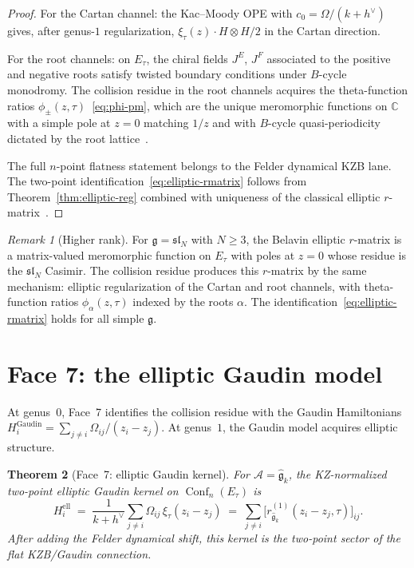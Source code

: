 \documentclass[11pt]{article}
\theoremstyle{plain}
\newtheorem{theorem}{Theorem}[section]
\theoremstyle{definition}
\theoremstyle{remark}
\newtheorem{remark}[theorem]{Remark}
\newcommand{\fg}{\mathfrak{g}}
\newcommand{\fsl}{\mathfrak{sl}}
\newcommand{\cA}{\mathcal{A}}
\DeclareMathOperator{\Conf}{Conf}
\numberwithin{equation}{section}
\begin{document}
\begin{proof}
For the Cartan channel: the Kac--Moody OPE with
$c_0 = \Omega/(k+h^\vee)$ gives, after genus-$1$ regularization,
$\xi_\tau(z)\cdot H \otimes H/2$ in the Cartan direction.

For the root channels: on $E_\tau$, the chiral fields $J^E$, $J^F$
associated to the positive and negative roots satisfy twisted boundary
conditions under $B$-cycle monodromy. The collision residue in the
root channels acquires the theta-function ratios
$\phi_\pm(z,\tau)$~\eqref{eq:phi-pm}, which are the unique
meromorphic functions on $\mathbb{C}$ with a simple pole at $z = 0$
matching $1/z$ and with $B$-cycle quasi-periodicity dictated by the
root lattice~\cite{Belavin81}.

The full \(n\)-point flatness statement belongs to the Felder dynamical
KZB lane. The two-point identification~\eqref{eq:elliptic-rmatrix}
follows from
Theorem~\ref{thm:elliptic-reg} combined with uniqueness of the
classical elliptic $r$-matrix~\cite{BelavinDrinfeld82}.
\end{proof}

\begin{remark}[Higher rank]\label{rem:higher-rank}
For $\fg = \fsl_N$ with $N \geq 3$, the Belavin elliptic $r$-matrix
is a matrix-valued meromorphic function on $E_\tau$ with poles at
$z = 0$ whose residue is the $\fsl_N$ Casimir. The collision residue
produces this $r$-matrix by the same mechanism: elliptic
regularization of the Cartan and root channels, with theta-function
ratios $\phi_\alpha(z,\tau)$ indexed by the roots $\alpha$. The
identification~\eqref{eq:elliptic-rmatrix} holds for all simple $\fg$.
\end{remark}



\section{Face 7: the elliptic Gaudin model}\label{sec:gaudin}

At genus~$0$, Face~7 identifies the collision residue with the Gaudin
Hamiltonians
$H_i^{\mathrm{Gaudin}} = \sum_{j \neq i}\Omega_{ij}/(z_i - z_j)$.
At genus~$1$, the Gaudin model acquires elliptic structure.

\begin{theorem}[Face~7: elliptic Gaudin kernel]\label{thm:gaudin}
For $\cA = \widehat{\fg}_k$, the KZ-normalized two-point elliptic
Gaudin kernel on $\Conf_n(E_\tau)$ is
\begin{equation}\label{eq:elliptic-gaudin}
H_i^{\mathrm{ell}}
\;=\;
\frac{1}{k+h^\vee}\sum_{j \neq i}
\Omega_{ij}\,\xi_\tau(z_i - z_j)
\;=\;
\sum_{j \neq i}
\bigl[r_{\widehat{\fg}_k}^{(1)}(z_i - z_j,\tau)\bigr]_{ij}.
\end{equation}
After adding the Felder dynamical shift, this kernel is the
two-point sector of the flat KZB/Gaudin connection.
\end{theorem}
\end{document}
